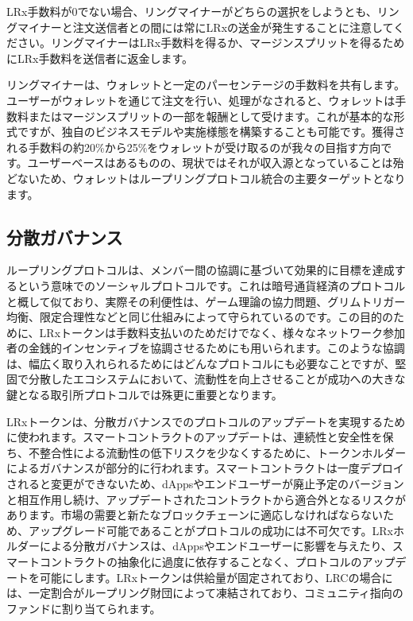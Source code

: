 \documentclass{article}
\begin{document}
\begin{multicols}{2}
LRx手数料が0でない場合、リングマイナーがどちらの選択をしようとも、リングマイナーと注文送信者との間には常にLRxの送金が発生することに注意してください。リングマイナーはLRx手数料を得るか、マージンスプリットを得るためにLRx手数料を送信者に返金します。

リングマイナーは、ウォレットと一定のパーセンテージの手数料を共有します。ユーザーがウォレットを通じて注文を行い、処理がなされると、ウォレットは手数料またはマージンスプリットの一部を報酬として受けます。これが基本的な形式ですが、独自のビジネスモデルや実施様態を構築することも可能です。獲得される手数料の約20\%から25\%をウォレットが受け取るのが我々の目指す方向です。ユーザーベースはあるものの、現状ではそれが収入源となっていることは殆どないため、ウォレットはループリングプロトコル統合の主要ターゲットとなります。

\subsection{分散ガバナンス}
ループリングプロトコルは、メンバー間の協調に基づいて効果的に目標を達成するという意味でのソーシャルプロトコルです。これは暗号通貨経済のプロトコルと概して似ており、実際その利便性は、ゲーム理論の協力問題\cite{vitalikgovernance}、グリムトリガー均衡、限定合理性などと同じ仕組みによって守られているのです。この目的のために、LRxトークンは手数料支払いのためだけでなく、様々なネットワーク参加者の金銭的インセンティブを協調させるためにも用いられます。このような協調は、幅広く取り入れられるためにはどんなプロトコルにも必要なことですが、堅固で分散したエコシステムにおいて、流動性を向上させることが成功への大きな鍵となる取引所プロトコルでは殊更に重要となります。

LRxトークンは、分散ガバナンスでのプロトコルのアップデートを実現するために使われます。スマートコントラクトのアップデートは、連続性と安全性を保ち、不整合性による流動性の低下リスクを少なくするために、トークンホルダーによるガバナンスが部分的に行われます。スマートコントラクトは一度デプロイされると変更ができないため、dAppsやエンドユーザーが廃止予定のバージョンと相互作用し続け、アップデートされたコントラクトから適合外となるリスクがあります。市場の需要と新たなブロックチェーンに適応しなければならないため、アップグレード可能であることがプロトコルの成功には不可欠です。LRxホルダーによる分散ガバナンスは、dAppsやエンドユーザーに影響を与えたり、スマートコントラクトの抽象化に過度に依存することなく、プロトコルのアップデートを可能にします。LRxトークンは供給量が固定されており、LRCの場合には、一定割合がループリング財団によって凍結されており、コミュニティ指向のファンドに割り当てられます\cite{LRCtokendoc}。


\end{multicols}
\end{document}
